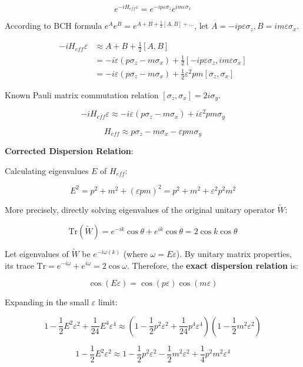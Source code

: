 \[e^{-i H_{eff} \varepsilon} = e^{-i p \varepsilon \sigma_z} e^{i m \varepsilon \sigma_x}\]

According to BCH formula $e^A e^B = e^{A+B + \frac{1}{2}[A,B] + \dots}$, let $A = -i p \varepsilon \sigma_z, B = i m \varepsilon \sigma_x$.

\begin{align*}
-i H_{eff} \varepsilon &\approx A + B + \frac{1}{2} [A, B] \\
&= -i\varepsilon (p \sigma_z - m \sigma_x) + \frac{1}{2} [-i p \varepsilon \sigma_z, i m \varepsilon \sigma_x] \\
&= -i\varepsilon (p \sigma_z - m \sigma_x) + \frac{1}{2} \varepsilon^2 pm [\sigma_z, \sigma_x]
\end{align*}

Known Pauli matrix commutation relation $[\sigma_z, \sigma_x] = 2i \sigma_y$.

\[-i H_{eff} \varepsilon \approx -i\varepsilon (p \sigma_z - m \sigma_x) + i \varepsilon^2 pm \sigma_y\]

\[H_{eff} \approx p \sigma_z - m \sigma_x - \varepsilon pm \sigma_y\]

\textbf{Corrected Dispersion Relation}:

Calculating eigenvalues $E$ of $H_{eff}$:

\[E^2 = p^2 + m^2 + (\varepsilon pm)^2 = p^2 + m^2 + \varepsilon^2 p^2 m^2\]

More precisely, directly solving eigenvalues of the original unitary operator $\tilde{W}$:

\[\text{Tr}(\tilde{W}) = e^{-ik} \cos\theta + e^{ik} \cos\theta = 2 \cos k \cos \theta\]

Let eigenvalues of $\tilde{W}$ be $e^{-i \omega(k)}$ (where $\omega = E \varepsilon$). By unitary matrix properties, its trace $\text{Tr} = e^{-i\omega} + e^{i\omega} = 2 \cos \omega$.
Therefore, the \textbf{exact dispersion relation} is:

\[\cos(E \varepsilon) = \cos(p \varepsilon) \cos(m \varepsilon)\]

Expanding in the small $\varepsilon$ limit:

\[1 - \frac{1}{2}E^2\varepsilon^2 + \frac{1}{24}E^4\varepsilon^4 \approx \left(1 - \frac{1}{2}p^2\varepsilon^2 + \frac{1}{24}p^4\varepsilon^4\right) \left(1 - \frac{1}{2}m^2\varepsilon^2\right)\]

\[1 - \frac{1}{2}E^2\varepsilon^2 \approx 1 - \frac{1}{2}p^2\varepsilon^2 - \frac{1}{2}m^2\varepsilon^2 + \frac{1}{4}p^2 m^2 \varepsilon^4\]

